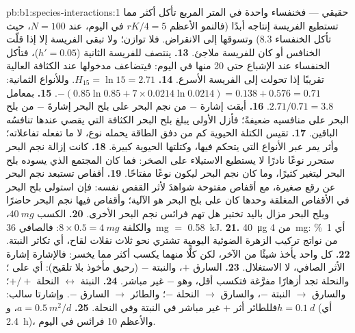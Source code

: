 \begin{solution}{pb:b1:species-interactions:1}
 حقيقي --- فخنفساء واحدة في المتر المربع تأكل أكثر مما تستطيع
الفريسة إنتاجه أبدًا (فالنمو الأعظم $rK/4 = 5$ في اليوم، عند $N = 100$، حيث
تأكل الخنفساء 8.3) وتسوقها إلى الانقراض. فلا توازن؛
ولا تبقى الفريسة إلا إذا قلّت الخنافس أو كان للفريسة ملاجئ.
\textbf{13.} ينتصف  للفريسة الثانية ($h' = 0.05$)،
فتأكل الخنفساء عند الإشباع حتى 20 منها في اليوم: فيتضاعف مدخولها
عند الكثافة العالية تقريبًا إذا تحولت إلى الفريسة الأسرع.
\textbf{14.} $H_{15} = \ln 15 = 2.71$. وللأنواع الثمانية: $-(0.85\ln 0.85
+ 7\times 0.0214\ln 0.0214) = 0.138 + 0.576 = 0.71$.
\textbf{15.} بمعامل $2.71/0.71 = 3.8$.
\textbf{16.} أبقت إشارة $-$ من نجم البحر على بلح البحر إشارةَ $-$ من بلح البحر
على منافسيه ضعيفةً؛ فأزل الأولى يبلغ بلح البحر
الكثافة التي يقصي عندها تنافسُه الباقين.
\textbf{17.} تقيس الكتلة الحيوية كم من دفق الطاقة يحمله نوع،
لا ما تفعله تفاعلاته؛ وأثر  يمر عبر
الأنواع التي يتحكم فيها، وكتلتها الحيوية كبيرة.
\textbf{18.} كانت إزالة نجم البحر ستحرر نوعًا نادرًا
لا يستطيع الاستيلاء على الصخر: فما كان المجتمع الذي يسوده بلح البحر
ليتغير كثيرًا، وما كان نجم البحر
ليكون نوعًا مفتاحًا.
\textbf{19.} أقفاص تستبعد نجم البحر عن رقع صغيرة، مع
أقفاص مفتوحة شواهدَ لأثر القفص نفسه: فإن استولى بلح البحر
في الأقفاص المغلقة وحدها كان  على بلح البحر هو الآلية؛
وأقفاص فيها نجم البحر حاضرًا وبلح البحر مزال باليد
تختبر هل تهم فرائس نجم البحر الأخرى.
\textbf{20.} الكسب $\qty{40}{mg}$، والكلفة $8\times 0.5 = \qty{4}{mg}$: فالصافي
\qty{36}{mg} $=$ \qty{0.58}{kJ}.
\textbf{21.} \qty{40}{\micro g} من \qty{4}{mg}: أي \qty{1}{\%} من
نواتج تركيب الزهرة الضوئية اليومية تشتري نحو ثلاث نقلات لقاح، أي
تكاثر النبتة.
\textbf{22.} كل واحد يأخذ شيئًا من الآخر، لكن كلًّا منهما يكسب أكثر
مما يخسر: فالإشارة إشارة الأثر الصافي، لا
الاستغلال.
\textbf{23.} السارق $+$، والنبتة $-$ (رحيق مأخوذ بلا تلقيح): أي
 على ؛ والنحلة تجد أزهارًا مفرَّغة فتكسب
أقل، وهو $-$ غير مباشر.
\textbf{24.} النبتة $\leftrightarrow$ النحلة $+/+$؛ والسارق $\to$ النبتة $-$،
والسارق $\to$ النحلة $-$؛ والطائر $\to$ السارق $-$. وإشارتا سالب: فللطائر
أثر $+$ غير مباشر في النبتة وفي النحلة.
\textbf{25.} $a = \qty{0.5}{m^2/d}$، و$h = \qty{0.1}{d}$ (أي \qty{2.4}{h})،
والأعظم \num{10} فرائس في اليوم.
\end{solution}
